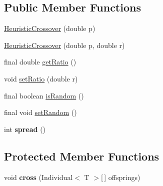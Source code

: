 \subsection*{Public Member Functions}
\begin{DoxyCompactItemize}
\item 
\hyperlink{classjenes_1_1stage_1_1operator_1_1common_1_1_heuristic_crossover_3_01_t_01extends_01_double_chromosome_01_4_ab1d3d3ec4281a97824e9859fddfba792}{Heuristic\-Crossover} (double p)
\item 
\hyperlink{classjenes_1_1stage_1_1operator_1_1common_1_1_heuristic_crossover_3_01_t_01extends_01_double_chromosome_01_4_a45df3b701ffb650f013d3b65753f4ffa}{Heuristic\-Crossover} (double p, double r)
\item 
final double \hyperlink{classjenes_1_1stage_1_1operator_1_1common_1_1_heuristic_crossover_3_01_t_01extends_01_double_chromosome_01_4_acab7758424b5132b15579fff5da094d5}{get\-Ratio} ()
\item 
void \hyperlink{classjenes_1_1stage_1_1operator_1_1common_1_1_heuristic_crossover_3_01_t_01extends_01_double_chromosome_01_4_adec77409f57afee4170cacb806e7254c}{set\-Ratio} (double r)
\item 
final boolean \hyperlink{classjenes_1_1stage_1_1operator_1_1common_1_1_heuristic_crossover_3_01_t_01extends_01_double_chromosome_01_4_ab965521456ce0233197659c9eb7f0e16}{is\-Random} ()
\item 
final void \hyperlink{classjenes_1_1stage_1_1operator_1_1common_1_1_heuristic_crossover_3_01_t_01extends_01_double_chromosome_01_4_ad3c86ba10d567679be7750185c955ef2}{set\-Random} ()
\item 
\hypertarget{classjenes_1_1stage_1_1operator_1_1common_1_1_heuristic_crossover_3_01_t_01extends_01_double_chromosome_01_4_aa2443a20ee35492f91c021f0b369354d}{int {\bfseries spread} ()}\label{classjenes_1_1stage_1_1operator_1_1common_1_1_heuristic_crossover_3_01_t_01extends_01_double_chromosome_01_4_aa2443a20ee35492f91c021f0b369354d}

\end{DoxyCompactItemize}
\subsection*{Protected Member Functions}
\begin{DoxyCompactItemize}
\item 
\hypertarget{classjenes_1_1stage_1_1operator_1_1common_1_1_heuristic_crossover_3_01_t_01extends_01_double_chromosome_01_4_aeb3cbe441f2588644e5129d7501c90ed}{void {\bfseries cross} (Individual$<$ T $>$\mbox{[}$\,$\mbox{]} offsprings)}\label{classjenes_1_1stage_1_1operator_1_1common_1_1_heuristic_crossover_3_01_t_01extends_01_double_chromosome_01_4_aeb3cbe441f2588644e5129d7501c90ed}

\end{DoxyCompactItemize}
